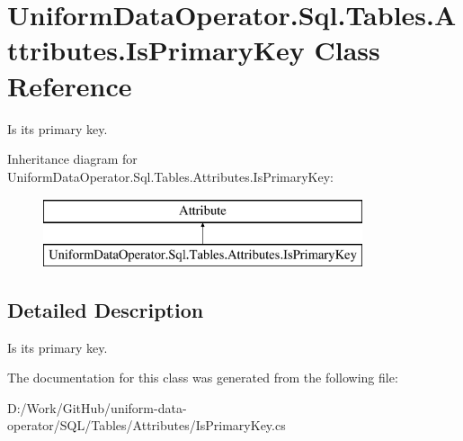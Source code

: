 \hypertarget{class_uniform_data_operator_1_1_sql_1_1_tables_1_1_attributes_1_1_is_primary_key}{}\section{Uniform\+Data\+Operator.\+Sql.\+Tables.\+Attributes.\+Is\+Primary\+Key Class Reference}
\label{class_uniform_data_operator_1_1_sql_1_1_tables_1_1_attributes_1_1_is_primary_key}


Is it\textquotesingle{}s primary key.  


Inheritance diagram for Uniform\+Data\+Operator.\+Sql.\+Tables.\+Attributes.\+Is\+Primary\+Key\+:\begin{figure}[H]
\begin{center}
\leavevmode
\includegraphics[height=2.000000cm]{d9/dad/class_uniform_data_operator_1_1_sql_1_1_tables_1_1_attributes_1_1_is_primary_key}
\end{center}
\end{figure}


\subsection{Detailed Description}
Is it\textquotesingle{}s primary key. 



The documentation for this class was generated from the following file\+:\begin{DoxyCompactItemize}
\item 
D\+:/\+Work/\+Git\+Hub/uniform-\/data-\/operator/\+S\+Q\+L/\+Tables/\+Attributes/Is\+Primary\+Key.\+cs\end{DoxyCompactItemize}
